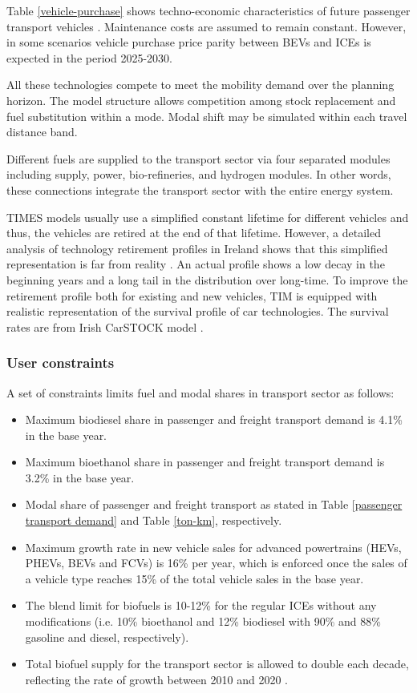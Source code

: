 \documentclass[gmd,manuscript]{copernicus}
\begin{document}
Table \ref{vehicle-purchase} shows techno-economic characteristics of future passenger transport vehicles \citep{Mulholland2017,Helgeson2020}. Maintenance costs are assumed to remain constant. However, in some scenarios vehicle purchase price parity between BEVs and ICEs is expected in the period 2025-2030. 

All these technologies compete to meet the mobility demand over the planning horizon. The model structure allows competition among stock replacement and fuel substitution within a mode. Modal shift may be simulated within each travel distance band. 

Different fuels are supplied to the transport sector via four separated modules including supply, power, bio-refineries, and hydrogen modules. In other words, these connections integrate the transport sector with the entire energy system.

TIMES models usually use a simplified constant lifetime for different vehicles and thus, the vehicles are retired at the end of that lifetime. However, a detailed analysis of technology retirement profiles in Ireland shows that this simplified representation is far from reality \citep{Mulholland2018}. An actual profile shows a low decay in the beginning years and a long tail in the distribution over long-time. To improve the retirement profile both for existing and new vehicles, TIM is equipped with realistic representation of the survival profile of car technologies. The survival rates are from Irish CarSTOCK model \citep{daly2011modelling, Mulholland2018}. 

\subsubsection{User constraints}

A set of constraints limits fuel and modal shares in transport sector as follows: 
\begin{itemize}
 \item Maximum biodiesel share in passenger and freight transport demand is 4.1\% in the base year.
 \item Maximum bioethanol share in passenger and freight transport demand is 3.2\% in the base year.
 \item Modal share of passenger and freight transport as stated in Table \ref{passenger transport demand} and Table \ref{ton-km}, respectively. 
 \item Maximum growth rate in new vehicle sales for advanced powertrains (HEVs, PHEVs, BEVs and FCVs) is 16\% per year, which is enforced once the sales of a vehicle type reaches 15\% of the total vehicle sales in the base year.
 \item The blend limit for biofuels is 10-12\% for the regular ICEs without any modifications (i.e. 10\% bioethanol and 12\% biodiesel with 90\% and 88\% gasoline and diesel, respectively). 
 \item Total biofuel supply for the transport sector is allowed to double each decade, reflecting the rate of growth between 2010 and 2020 \citep{NORA2019}. 
\end{itemize}
\end{document}
